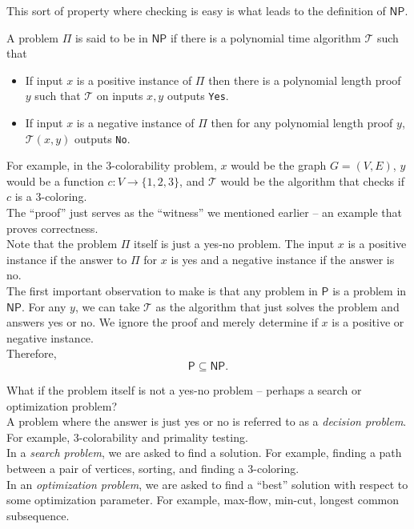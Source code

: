 	This sort of property where checking is easy is what leads to the definition of $\mathsf{NP}$.

	\begin{fdef}
		A problem $\mathsf{\Pi}$ is said to be in $\mathsf{NP}$ if there is a polynomial time algorithm $\mathcal{T}$ such that
		\begin{itemize}
			\item If input $x$ is a positive instance of $\mathsf{\Pi}$ then there is a polynomial length proof $y$ such that $\mathcal{T}$ on inputs $x,y$ outputs \texttt{Yes}.
			\item If input $x$ is a negative instance of $\mathsf{\Pi}$ then for any polynomial length proof $y$, $\mathcal{T}(x,y)$ outputs \texttt{No}.
		\end{itemize}
	\end{fdef}

	For example, in the $3$-colorability problem, $x$ would be the graph $G=(V,E)$, $y$ would be a function $c:V\to\{1,2,3\}$, and $\mathcal{T}$ would be the algorithm that checks if $c$ is a $3$-coloring.\\
	The ``proof'' just serves as the ``witness'' we mentioned earlier -- an example that proves correctness.\\

	Note that the problem $\mathsf{\Pi}$ itself is just a yes-no problem. The input $x$ is a positive instance if the answer to $\mathsf{\Pi}$ for $x$ is yes and a negative instance if the answer is no.\\

	The first important observation to make is that any problem in $\mathsf{P}$ is a problem in $\mathsf{NP}$. For any $y$, we can take $\mathcal{T}$ as the algorithm that just solves the problem and answers yes or no. We ignore the proof and merely determine if $x$ is a positive or negative instance.\\
	Therefore,
	\[ \mathsf{P} \subseteq \mathsf{NP}. \]

	What if the problem itself is not a yes-no problem -- perhaps a search or optimization problem?\\
	A problem where the answer is just yes or no is referred to as a \textit{decision problem}. For example, $3$-colorability and primality testing.\\
	In a \textit{search problem}, we are asked to find a solution. For example, finding a path between a pair of vertices, sorting, and finding a $3$-coloring.\\
	In an \textit{optimization problem}, we are asked to find a ``best'' solution with respect to some optimization parameter. For example, max-flow, min-cut, longest common subsequence.\\

